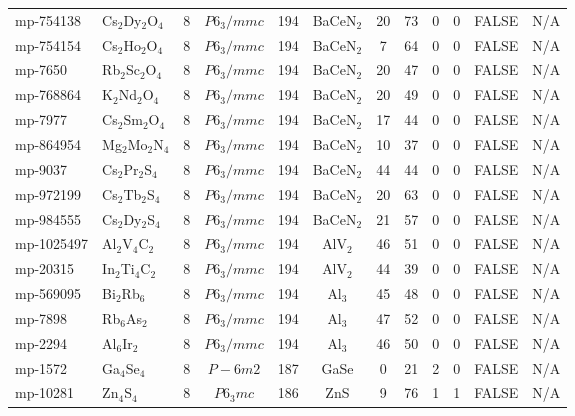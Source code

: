 {\begin{longtable}{llcccccccccc}
    mp-754138 & Cs$_{2}$Dy$_{2}$O$_{4}$ & 8     & $P6_3/mmc$ & 194   & BaCeN$_{2}$ & 20    & 73    & 0     & 0     & FALSE & N/A \\
    mp-754154 & Cs$_{2}$Ho$_{2}$O$_{4}$ & 8     & $P6_3/mmc$ & 194   & BaCeN$_{2}$ & 7     & 64    & 0     & 0     & FALSE & N/A \\
    mp-7650 & Rb$_{2}$Sc$_{2}$O$_{4}$ & 8     & $P6_3/mmc$ & 194   & BaCeN$_{2}$ & 20    & 47    & 0     & 0     & FALSE & N/A \\
    mp-768864 & K$_{2}$Nd$_{2}$O$_{4}$ & 8     & $P6_3/mmc$ & 194   & BaCeN$_{2}$ & 20    & 49    & 0     & 0     & FALSE & N/A \\
    mp-7977 & Cs$_{2}$Sm$_{2}$O$_{4}$ & 8     & $P6_3/mmc$ & 194   & BaCeN$_{2}$ & 17    & 44    & 0     & 0     & FALSE & N/A \\
    mp-864954 & Mg$_{2}$Mo$_{2}$N$_{4}$ & 8     & $P6_3/mmc$ & 194   & BaCeN$_{2}$ & 10    & 37    & 0     & 0     & FALSE & N/A \\
    mp-9037 & Cs$_{2}$Pr$_{2}$S$_{4}$ & 8     & $P6_3/mmc$ & 194   & BaCeN$_{2}$ & 44    & 44    & 0     & 0     & FALSE & N/A \\
    mp-972199 & Cs$_{2}$Tb$_{2}$S$_{4}$ & 8     & $P6_3/mmc$ & 194   & BaCeN$_{2}$ & 20    & 63    & 0     & 0     & FALSE & N/A \\
    mp-984555 & Cs$_{2}$Dy$_{2}$S$_{4}$ & 8     & $P6_3/mmc$ & 194   & BaCeN$_{2}$ & 21    & 57    & 0     & 0     & FALSE & N/A \\
    mp-1025497 & Al$_{2}$V$_{4}$C$_{2}$ & 8     & $P6_3/mmc$ & 194   & AlV$_{2}$ & 46    & 51    & 0     & 0     & FALSE & N/A \\
    mp-20315 & In$_{2}$Ti$_{4}$C$_{2}$ & 8     & $P6_3/mmc$ & 194   & AlV$_{2}$ & 44    & 39    & 0     & 0     & FALSE & N/A \\
    mp-569095 & Bi$_{2}$Rb$_{6}$ & 8     & $P6_3/mmc$ & 194   & Al$_{3}$ & 45    & 48    & 0     & 0     & FALSE & N/A \\
    mp-7898 & Rb$_{6}$As$_{2}$ & 8     & $P6_3/mmc$ & 194   & Al$_{3}$ & 47    & 52    & 0     & 0     & FALSE & N/A \\
    mp-2294 & Al$_{6}$Ir$_{2}$ & 8     & $P6_3/mmc$ & 194   & Al$_{3}$ & 46    & 50    & 0     & 0     & FALSE & N/A \\
    mp-1572 & Ga$_{4}$Se$_{4}$ & 8     & $P-6m2$ & 187   & GaSe  & 0     & 21    & 2     & 0     & FALSE & N/A \\
    mp-10281 & Zn$_{4}$S$_{4}$ & 8     & $P6_3mc$ & 186   & ZnS   & 9     & 76    & 1     & 1     & FALSE & N/A \\

\end{longtable}}
